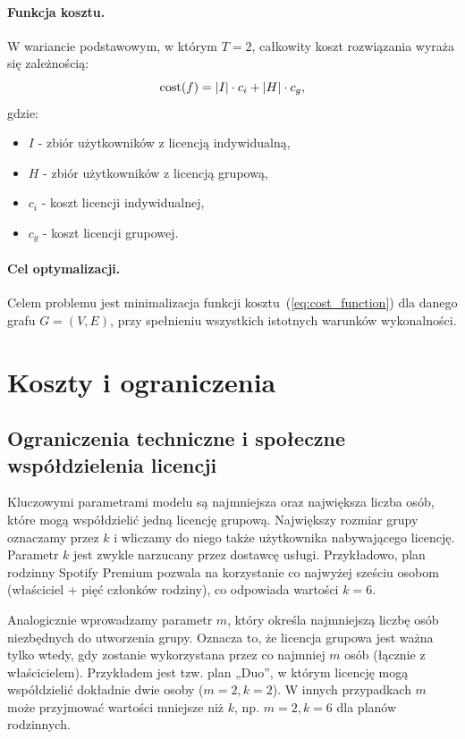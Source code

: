 \paragraph{Funkcja kosztu.}
W wariancie podstawowym, w którym $T=2$, całkowity koszt rozwiązania wyraża się zależnością:
\begin{equation}
  \operatorname{cost}(f) = |I|\cdot c_i + |H|\cdot c_g ,
  \label{eq:cost_function}
\end{equation}
gdzie:
\begin{itemize}
  \item $I$ - zbiór użytkowników z licencją indywidualną,
  \item $H$ - zbiór użytkowników z licencją grupową,
  \item $c_i$ - koszt licencji indywidualnej,
  \item $c_g$ - koszt licencji grupowej.
\end{itemize}

\paragraph{Cel optymalizacji.}
Celem problemu jest minimalizacja funkcji kosztu~(\ref{eq:cost_function}) dla danego grafu $G=(V,E)$, przy spełnieniu wszystkich istotnych warunków wykonalności.


\section{Koszty i ograniczenia}

\subsection{Ograniczenia techniczne i społeczne współdzielenia licencji}

Kluczowymi parametrami modelu są najmniejsza oraz największa liczba osób, które mogą współdzielić jedną licencję grupową. Największy rozmiar grupy oznaczamy przez $k$ i wliczamy do niego także użytkownika nabywającego licencję. Parametr $k$ jest zwykle narzucany przez dostawcę usługi. Przykładowo, plan rodzinny Spotify Premium pozwala na korzystanie co najwyżej sześciu osobom (właściciel + pięć członków rodziny), co odpowiada wartości $k=6$.

Analogicznie wprowadzamy parametr $m$, który określa najmniejszą liczbę osób niezbędnych do utworzenia grupy. Oznacza to, że licencja grupowa jest ważna tylko wtedy, gdy zostanie wykorzystana przez co najmniej $m$ osób (łącznie z właścicielem). Przykładem jest tzw. plan „Duo”, w którym licencję mogą współdzielić dokładnie dwie osoby ($m=2, k=2$). W innych przypadkach $m$ może przyjmować wartości mniejsze niż $k$, np. $m=2, k=6$ dla planów rodzinnych.


